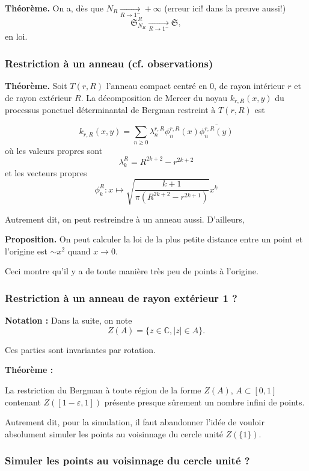 \documentclass[9pt]{beamer}
\begin{document}
\begin{frame}
    \bigskip

    \textbf{Théorème.} On a, dès que $ N_R \xrightarrow[R \to 1^-]{} +\infty $ (erreur ici! dans la preuve aussi!)
    \[
        \mathfrak{S}_{N_R}^R \xrightarrow[R \to 1^-]{} \mathfrak{S},
    \]
    en loi. 

\end{frame}\begin{frame}\frametitle{Restriction à un anneau (cf. observations)}

    \textbf{Théorème.} Soit $T(r,R)$ l’anneau compact centré en 0, de rayon intérieur $r$ et de rayon extérieur $R$. La décomposition de Mercer du noyau $k_{r,R}(x,y)$ du processus ponctuel déterminantal de Bergman restreint à $T(r,R)$ est

    \[
        k_{r,R}(x,y) = \sum_{n \ge 0} \lambda_n^{r,R} \phi_n^{r,R}(x) \overline{\phi_n^{r,R}(y)}
    \]
    où les valeurs propres sont
    \[
    \lambda_k^R = R^{2k+2} - r^{2k+2}
    \]
    et les vecteurs propres
    \[
    \phi_k^R: x \mapsto \sqrt{\frac{k+1}{\pi(R^{2k+2} - r^{2k+1})}} x^k
    \]

    \bigskip

    Autrement dit, on peut restreindre à un anneau aussi. D'ailleurs, 

    \textbf{Proposition.} On peut calculer la loi de la plus petite distance entre un point et l'origine est $ \sim x^2$ quand $ x\to 0$.

    Ceci montre qu'il y a de toute manière très peu de points à l'origine.

\end{frame}\begin{frame}\frametitle{Restriction à un anneau de rayon extérieur 1 ?}

    \textbf{Notation :} Dans la suite, on note 
    \[
    Z(A) = \{z \in \mathbb{C}, |z| \in A\}.
    \]

    Ces parties sont invariantes par rotation.

    \textbf{Théorème :}
    
    La restriction du Bergman à toute région de la forme \( Z(A) \), \( A \subset [0,1] \) contenant \( Z([1-\varepsilon, 1]) \) présente presque sûrement un nombre infini de points.

    Autrement dit, pour la simulation, il faut abandonner l'idée de vouloir absolument simuler les points au voisinnage du cercle unité $ Z(\{1\}) $.

\end{frame}\begin{frame}\frametitle{Simuler les points au voisinnage du cercle unité ?}



\end{frame}
\end{document}

